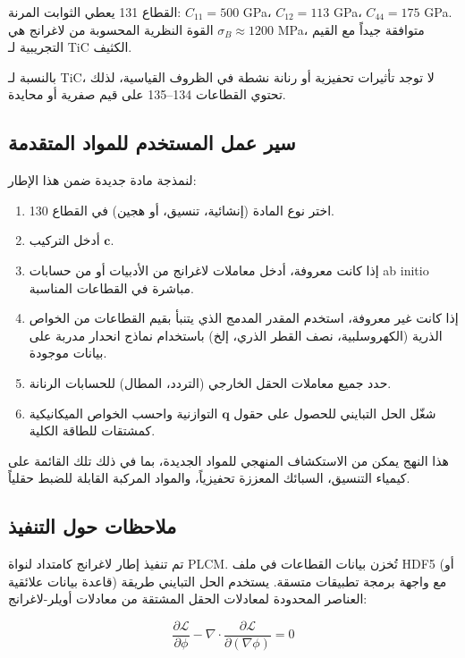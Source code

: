 \documentclass[11pt,a4paper]{article}
\begin{document}
\begin{otherlanguage}{arabic}
		القطاع 131 يعطي الثوابت المرنة: \(C_{11}=500\) GPa، \(C_{12}=113\) GPa، \(C_{44}=175\) GPa. القوة النظرية المحسوبة من لاغرانج هي \(\sigma_B \approx 1200\) MPa، متوافقة جيداً مع القيم التجريبية لـ TiC الكثيف.
		
		بالنسبة لـ TiC، لا توجد تأثيرات تحفيزية أو رنانة نشطة في الظروف القياسية، لذلك تحتوي القطاعات 134–135 على قيم صفرية أو محايدة.
		
		\subsection{سير عمل المستخدم للمواد المتقدمة}
		\label{subsec:workflow}
		
		لنمذجة مادة جديدة ضمن هذا الإطار:
		
		\begin{enumerate}
			\item اختر نوع المادة (إنشائية، تنسيق، أو هجين) في القطاع 130.
			\item أدخل التركيب \(\mathbf{c}\).
			\item إذا كانت معروفة، أدخل معاملات لاغرانج من الأدبيات أو من حسابات ab initio مباشرة في القطاعات المناسبة.
			\item إذا كانت غير معروفة، استخدم المقدر المدمج الذي يتنبأ بقيم القطاعات من الخواص الذرية (الكهروسلبية، نصف القطر الذري، إلخ) باستخدام نماذج انحدار مدربة على بيانات موجودة.
			\item حدد جميع معاملات الحقل الخارجي (التردد، المطال) للحسابات الرنانة.
			\item شغّل الحل التبايني للحصول على حقول \(\mathbf{q}\) التوازنية واحسب الخواص الميكانيكية كمشتقات للطاقة الكلية.
		\end{enumerate}
		
		هذا النهج يمكن من الاستكشاف المنهجي للمواد الجديدة، بما في ذلك تلك القائمة على كيمياء التنسيق، السبائك المعززة تحفيزياً، والمواد المركبة القابلة للضبط حقلياً.
		
		\subsection{ملاحظات حول التنفيذ}
		\label{subsec:implementation}
		
		تم تنفيذ إطار لاغرانج كامتداد لنواة PLCM. تُخزن بيانات القطاعات في ملف HDF5 (أو قاعدة بيانات علائقية) مع واجهة برمجة تطبيقات متسقة. يستخدم الحل التبايني طريقة العناصر المحدودة لمعادلات الحقل المشتقة من معادلات أويلر-لاغرانج:
		
		\[
		\frac{\partial \mathcal{L}}{\partial \phi} - \nabla \cdot \frac{\partial \mathcal{L}}{\partial (\nabla\phi)} = 0
		\]
		

\end{otherlanguage}
\end{document}
